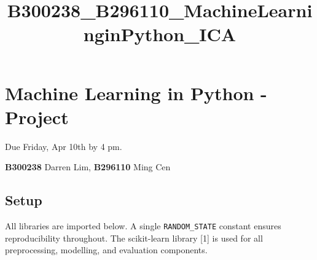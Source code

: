 \documentclass[11pt]{article}
\title{B300238\_B296110\_MachineLearninginPython\_ICA}
\begin{document}
    
    \maketitle
    
    

    \setcounter{secnumdepth}{0}
    \hypertarget{machine-learning-in-python---project}{%
\section{Machine Learning in Python -
Project}\label{machine-learning-in-python---project}}

Due Friday, Apr 10th by 4 pm.

\textbf{B300238} Darren Lim, \textbf{B296110} Ming Cen

    \hypertarget{setup}{%
\subsection{Setup}\label{setup}}

All libraries are imported below. A single \texttt{RANDOM\_STATE}
constant ensures reproducibility throughout. The scikit-learn library
{[}1{]} is used for all preprocessing, modelling, and evaluation
components.
\end{document}
